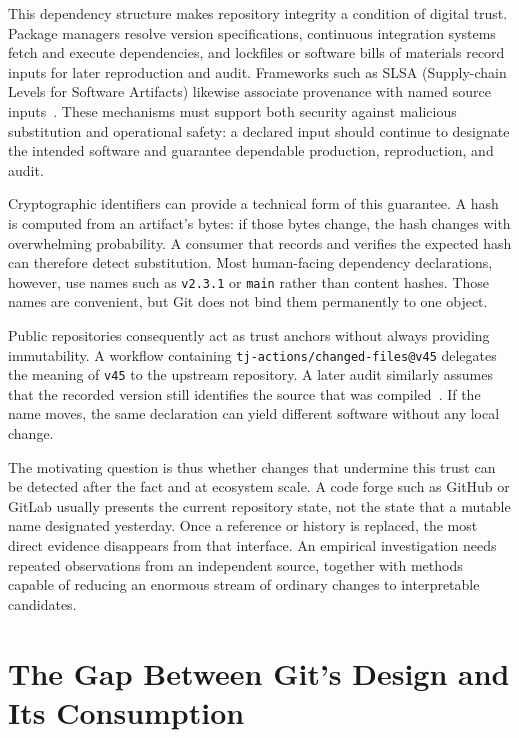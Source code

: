 \label{subsec:intro-oss-critical}%
This dependency structure makes repository integrity a condition of digital trust.
Package managers resolve version specifications, continuous integration systems fetch and execute dependencies, and lockfiles or software bills of materials record inputs for later reproduction and audit.
Frameworks such as SLSA (Supply-chain Levels for Software Artifacts) likewise associate provenance with named source inputs~\cite{tamanna2024analyzingchallengesdeploymentslsa}.
These mechanisms must support both security against malicious substitution and operational safety: a declared input should continue to designate the intended software and guarantee dependable production, reproduction, and audit.

\label{subsec:intro-trust-anchors}%
Cryptographic identifiers can provide a technical form of this guarantee.
A hash is computed from an artifact's bytes: if those bytes change, the hash changes with overwhelming probability.
A consumer that records and verifies the expected hash can therefore detect substitution.
Most human-facing dependency declarations, however, use names such as \texttt{v2.3.1} or \texttt{main} rather than content hashes.
Those names are convenient, but Git does not bind them permanently to one object.

Public repositories consequently act as trust anchors without always providing immutability.
A workflow containing \texttt{tj-actions/changed-files@v45} delegates the meaning of \texttt{v45} to the upstream repository.
A later audit similarly assumes that the recorded version still identifies the source that was compiled~\cite{Vu21}.
If the name moves, the same declaration can yield different software without any local change.

\label{subsec:intro-security-assumptions}%
The motivating question is thus whether changes that undermine this trust can be detected after the fact and at ecosystem scale.
A code forge such as GitHub or GitLab usually presents the current repository state, not the state that a mutable name designated yesterday.
Once a reference or history is replaced, the most direct evidence disappears from that interface.
An empirical investigation needs repeated observations from an independent source, together with methods capable of reducing an enormous stream of ordinary changes to interpretable candidates.

\section{The Gap Between Git's Design and Its Consumption}
\label{sec:intro-problem}

